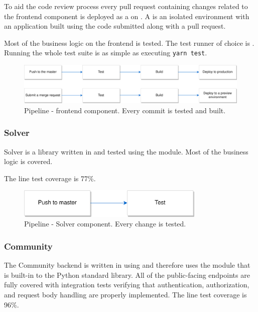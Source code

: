 \medskip

To aid the code review process every pull request containing changes related to the frontend component is deployed as a  on . A  is an isolated environment with an application built using the code submitted along with a pull request.

\medskip

Most of the business logic on the frontend is tested. The test runner of choice is . Running the whole test suite is as simple as executing \texttt{yarn test}.

\begin{figure}[H]
  \caption{Pipeline - frontend component. Every commit is tested and built.}
  \centering
    \includegraphics[width=\textwidth]{assets/3-frontend-pipeline.png}
\end{figure}
\clearpage
\subsubsection{Solver}

Solver is a library written in  and tested using the  module. Most of the business logic is covered. 

The line test coverage is 77\%.

\begin{figure}[H]
  \caption{Pipeline - Solver component. Every change is tested.}
  \centering
    \includegraphics[width=0.8\textwidth]{assets/3-Solver-pipeline.png}
\end{figure}


\subsubsection{Community}

The Community backend is written in  using  and therefore uses the  module that is built-in to the Python standard library. All of the public-facing endpoints are fully covered with integration tests verifying that authentication, authorization, and request body handling are properly implemented. The line test coverage is 96\%.

